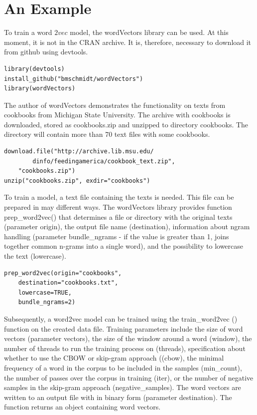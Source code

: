 \section{An Example}
To train a word $2 v e c$ model, the wordVectors library can be used. At this moment, it is not in the CRAN archive. It is, therefore, necessary to download it from github using devtools.

\begin{verbatim}
library(devtools)
install_github("bmschmidt/wordVectors")
library(wordVectors)
\end{verbatim}

The author of wordVectors demonstrates the functionality on texts from cookbooks from Michigan State University. The archive with cookbooks is downloaded, stored as cookbooks.zip and unzipped to directory cookbooks. The directory will contain more than 70 text files with some cookbooks.

\begin{verbatim}
download.file("http://archive.lib.msu.edu/
        dinfo/feedingamerica/cookbook_text.zip",
    "cookbooks.zip")
unzip("cookbooks.zip", exdir="cookbooks")
\end{verbatim}

To train a model, a text file containing the texts is needed. This file can be prepared in may different ways. The wordVectors library provides function prep\_word2vec() that determines a file or directory with the original texts (parameter origin), the output file name (destination), information about ngram handling (parameter bundle\_ngrams - if the value is greater than 1, joins together common n-grams into a single word), and the possibility to lowercase the text (lowercase).

\begin{verbatim}
prep_word2vec(origin="cookbooks",
    destination="cookbooks.txt",
    lowercase=TRUE,
    bundle_ngrams=2)
\end{verbatim}

Subsequently, a word2vec model can be trained using the train\_word2vec () function on the created data file. Training parameters include the size of word vectors (parameter vectors), the size of the window around a word (window), the number of threads to run the training process on (threads), specification about whether to use the CBOW or skip-gram approach ((cbow), the minimal frequency of a word in the corpus to be included in the samples (min\_count),\\
the number of passes over the corpus in training (iter), or the number of negative samples in the skip-gram approach (negative\_samples). The word vectors are written to an output file with in binary form (parameter destination). The function returns an object containing word vectors.

